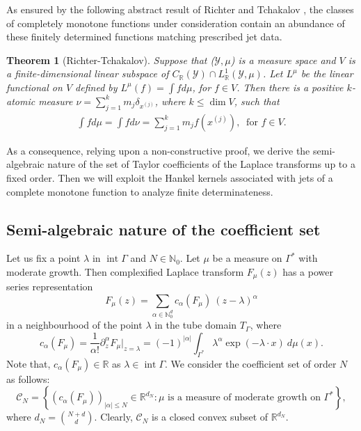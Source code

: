 \documentclass[11pt,reqno]{amsart}
\theoremstyle{plain}
\newtheorem{theorem}{Theorem}[section]
\theoremstyle{definition}
\numberwithin{equation}{section}
\begin{document}
As ensured by the following abstract result of Richter and Tchakalov \cite[Theorem 1.24]{Schmudgen-book}, the classes of completely monotone functions under consideration contain an abundance of these finitely determined functions matching prescribed jet data.
\begin{theorem}[Richter-Tchakalov] \label{Thm:RT}
		Suppose that ($\mathcal{Y}, \mu$) is a measure space and $V$ is a finite-dimensional linear subspace of $C_\mathbb{R}(\mathcal{Y}) \cap L^1_\mathbb{R}(\mathcal{Y}, \mu)$. Let $L^\mu$ be the linear functional on $V$ defined by $L^\mu(f) =\int f d\mu$, for $f\in V$. Then there is a positive $k$-atomic measure $\nu = \sum_{j=1}^k m_j \delta_{x^{(j)}}$, where $k\leq \operatorname{dim} V$, such that
		\begin{align*}
			\int fd\mu = \int f d\nu = \sum_{j=1}^k m_j f(x^{(j)}), \ \text{ for } f\in V.
		\end{align*}
	\end{theorem}

As a consequence, relying upon a non-constructive proof, we derive the semi-algebraic nature of the set of Taylor coefficients of the Laplace transforms up to a fixed order. Then we will exploit the Hankel kernels associated with jets of a complete monotone function to analyze finite determinateness.


	\subsection{Semi-algebraic nature of the coefficient set} 
	Let us fix a point $\lambda$ in $\operatorname{int} \Gamma$ and $N \in \mathbb{N}_0$. Let $\mu$ be a measure on $\Gamma^*$ with moderate growth. Then complexified Laplace transform $F_\mu(z)$ has a power series representation
    $$
	F_\mu(z) = \sum_{\alpha \in \mathbb{N}_0^d} c_{\alpha } (F_\mu) \ (z-\lambda)^\alpha
	$$
    in a neighbourhood of the point $\lambda$ in the tube domain $T_{\Gamma}$, where 
    $$ c_\alpha(F_\mu) = \frac{1}{\alpha !} \partial^\alpha_z F_\mu|_{z=\lambda} = (-1)^{|\alpha|} \int_{\Gamma^*} \lambda^\alpha \exp(-\lambda \cdot x) \ d\mu(x).$$
	Note that, $c_\alpha(F_\mu) \in \mathbb{R}$ as $\lambda \in \operatorname{int} \Gamma$.
	We consider the coefficient set of order $N$ as follows:
	$$
	\mathcal{C}_N = \left \lbrace  (c_{\alpha} (F_\mu))_{|\alpha | \leq N} \in \mathbb{R}^{d_N} : \mu \text{ is a measure of moderate growth on $\Gamma^*$} \right \rbrace,
	$$
	where $d_N = \binom{N+d}{d}$. Clearly, $\mathcal{C}_N$ is a closed convex subset of $\mathbb{R}^{d_N}$. 
\end{document}
